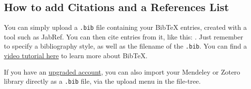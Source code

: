 \documentclass{article}
\begin{document}
\subsection{How to add Citations and a References List}

You can simply upload a \verb|.bib| file containing your BibTeX entries, created with a tool such as JabRef. You can then cite entries from it, like this: \cite{greenwade93}. Just remember to specify a bibliography style, as well as the filename of the \verb|.bib|. You can find a \href{https://www.overleaf.com/help/97-how-to-include-a-bibliography-using-bibtex}{video tutorial here} to learn more about BibTeX.

If you have an \href{https://www.overleaf.com/user/subscription/plans}{upgraded account}, you can also import your Mendeley or Zotero library directly as a \verb|.bib| file, via the upload menu in the file-tree.




\end{document}
